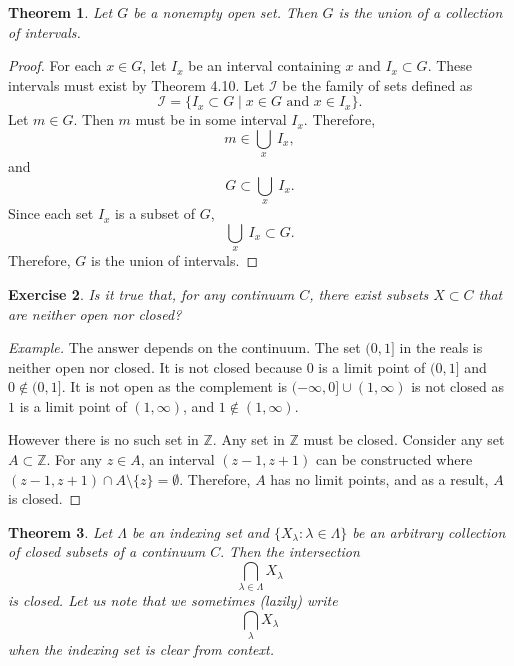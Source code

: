 \documentclass{amsart}
\newtheorem{theorem}{Theorem}
\newtheorem{exercise}[theorem]{Exercise}
\newcommand{\Z}{\mathbb Z}
\newcommand{\1}{\mathds{1}}
\def \Z {{\mathbb {Z}}}
\numberwithin{equation}{section}
\numberwithin{theorem}{section}
\begin{document}
\begin{theorem}\label{union}  Let $G$ be a nonempty open set.  Then $G$ is the union of a collection of intervals.  
\end{theorem}

\begin{proof}
	For each $x\in G$, let $I_x$ be an interval containing $x$ and $I_x\subset G$. These intervals must exist by Theorem 4.10. Let $\mathcal{I}$ be the family of sets defined as $$\mathcal{I} = \{I_x \subset G\mid x\in G \text{ and } x\in I_x\}.$$ Let $m\in G$. Then $m$ must be in some interval $I_x$. Therefore, $$m\in \bigcup_x \ I_x,$$ and $$G\subset \bigcup_x \ I_x.$$ Since each set $I_x$ is a subset of $G$, $$\bigcup_x \ I_x \subset G.$$ Therefore, $G$ is the union of intervals. 
\end{proof}

\begin{exercise}  Is it true that, for any continuum $C$, there exist subsets $X \subset C$ that are neither open nor closed?
\end{exercise}

\begin{proof}[Example]
	The answer depends on the continuum. The set $(0,1]$ in the reals is neither open nor closed. It is not closed because $0$ is a limit point of $(0,1]$ and $0\notin (0,1]$. It is not open as the complement is $(-\infty,0] \cup (1,\infty)$ is not closed as $1$ is a limit point of $(1,\infty)$, and $1\notin (1,\infty)$.
	
	However there is no such set in $\Z$. Any set in $\Z$ must be closed. Consider any set $A\subset \Z$. For any $z\in A$, an interval $(z-1,z+1)$ can be constructed where $(z-1,z+1)\cap A\setminus\{z\} = \emptyset.$ Therefore, $A$ has no limit points, and as a result, $A$ is closed. 
\end{proof}

\begin{theorem}  Let $\Lambda$ be an indexing set and $\{X_{\lambda}: \lambda \in \Lambda \}$ be an arbitrary collection of closed subsets of a continuum $C.$  Then the intersection
	\[
	\bigcap_{\lambda \in \Lambda} X_{\lambda}
	\]
	is closed.  Let us note that we sometimes (lazily) write
	\[
	\bigcap_{\lambda} X_{\lambda}
	\]
	when the indexing set is clear from context.
\end{theorem}
\end{document}
